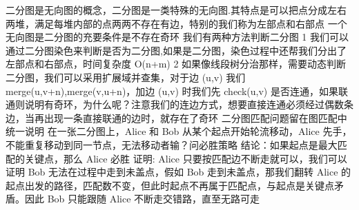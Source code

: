 \markdownRendererSectionEnd 
\markdownRendererSectionEnd 
\markdownRendererSectionEnd 
\markdownRendererSectionEnd \markdownRendererSectionBegin
{}\markdownRendererInterblockSeparator
{}二分图是无向图的概念，二分图是一类特殊的无向图.其特点是可以把点分成左右两堆，满足每堆内部的点两两不存在有边，特别的我们称为左部点和右部点\markdownRendererInterblockSeparator
{}\markdownRendererSectionBegin
{}\markdownRendererInterblockSeparator
{}一个无向图是二分图的充要条件是不存在奇环 我们有两种方法判断二分图\markdownRendererParagraphSeparator
{}\markdownRendererDollarSign{} 1 \markdownRendererDollarSign{}我们可以通过二分图染色来判断是否为二分图,如果是二分图，染色过程中还帮我们分出了左部点和右部点，时间复杂度\markdownRendererDollarSign{} O(n+m) \markdownRendererDollarSign{}\markdownRendererParagraphSeparator
{}\markdownRendererDollarSign{} 2 \markdownRendererDollarSign{}如果像线段树分治那样，需要动态判断二分图，我们可以采用扩展域并查集，对于边 \markdownRendererDollarSign{}(u,v)\markdownRendererDollarSign{} 我们 \markdownRendererDollarSign{}merge(u,v+n),merge(v,u+n)\markdownRendererDollarSign{}，加边 \markdownRendererDollarSign{}(u,v)\markdownRendererDollarSign{} 时我们先 \markdownRendererDollarSign{}check(u,v)\markdownRendererDollarSign{} 是否连通，如果联通则说明有奇环，为什么呢？注意我们的连边方式，想要直接连通必须经过偶数条边，当再出现一条直接联通的边时，就存在了奇环\markdownRendererInterblockSeparator
{}\markdownRendererSectionBegin
{}\markdownRendererInterblockSeparator
{}\markdownRendererInterblockSeparator
{}二分图匹配问题留在图匹配中统一说明\markdownRendererInterblockSeparator
{}
\markdownRendererSectionEnd 
\markdownRendererSectionEnd \markdownRendererSectionBegin
{}\markdownRendererInterblockSeparator
{}在一张二分图上，\markdownRendererDollarSign{}Alice\markdownRendererDollarSign{} 和 \markdownRendererDollarSign{}Bob\markdownRendererDollarSign{} 从某个起点开始轮流移动，\markdownRendererDollarSign{}Alice\markdownRendererDollarSign{} 先手，不能重复移动到同一节点，无法移动者输？问必胜策略\markdownRendererParagraphSeparator
{}结论：如果起点是最大匹配的关键点，那么 \markdownRendererDollarSign{}Alice\markdownRendererDollarSign{} 必胜\markdownRendererParagraphSeparator
{}证明: \markdownRendererDollarSign{}Alice\markdownRendererDollarSign{} 只要按匹配边不断走就可以，我们可以证明 \markdownRendererDollarSign{}Bob\markdownRendererDollarSign{} 无法在过程中走到未盖点，假如 \markdownRendererDollarSign{}Bob\markdownRendererDollarSign{} 走到未盖点，那我们翻转 \markdownRendererDollarSign{}Alice\markdownRendererDollarSign{} 的起点出发的路径，匹配数不变，但此时起点不再属于匹配点，与起点是关键点矛盾。因此 \markdownRendererDollarSign{}Bob\markdownRendererDollarSign{} 只能跟随 \markdownRendererDollarSign{}Alice\markdownRendererDollarSign{} 不断走交错路，直至无路可走\markdownRendererParagraphSeparator
